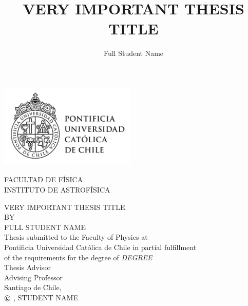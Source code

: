 \documentclass{mythesis}
\makeatletter
\newcommand\Romanyear{\@Roman{\year}}
\makeatother
\begin{document}
\title{VERY IMPORTANT THESIS TITLE}
\author{Full Student Name}
\date{}
\maketitle


\newpage
\pagestyle{empty}
\vspace*{-40.0mm}%
\hspace*{-10mm}%
        \parbox{80pt}
{\centering %
            \includegraphics*[width=65mm]{./figures/UC_lineal_TR-01.png}\\[.2\normalbaselineskip]       
        }
\begin{flushright}
\vspace*{-9.0mm}
FACULTAD DE F\'{I}SICA\\
INSTITUTO DE ASTROF\'{I}SICA
\end{flushright}
\begin{center}
\huge{VERY IMPORTANT THESIS TITLE}\\
\vspace{1.5cm}
\normalsize
BY\\
\Large{FULL STUDENT NAME}\\
\vspace{1.5cm}
\normalsize
Thesis submitted to the Faculty of Physics at\\ 
Pontificia Universidad Cat\'{o}lica de Chile in partial fulfillment\\
 of the requirements for the degree of \textit{DEGREE}\\
\vspace{1.5cm}
Thesis Advisor\\
\large{Advising Professor}\\
\vfill
\normalsize
Santiago de Chile, \monthname\, \the\year\\
\vspace{1.cm}
$\copyright$ \Romanyear, STUDENT NAME
\end{center}
\newpage
\end{document}
